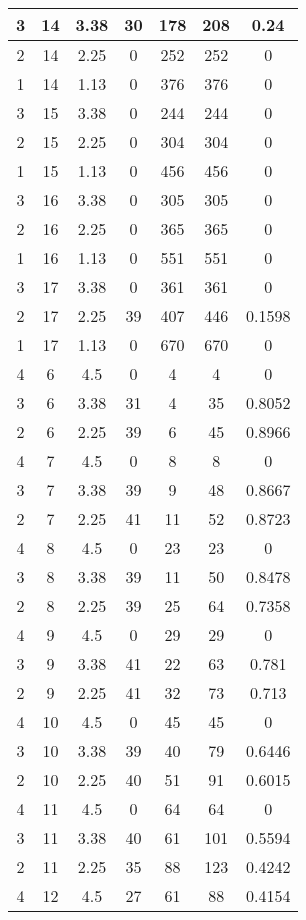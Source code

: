\documentclass[letterpaper, 12pt]{article}
\begin{document}
\begin{longtable}{|c|c|c|c|c|c|c|}
\hline
3 & 14 & 3.38 & 30 & 178 & 208 & 0.24 \\
\hline
2 & 14 & 2.25 & 0 & 252 & 252 & 0 \\
\hline
1 & 14 & 1.13 & 0 & 376 & 376 & 0 \\
\hline
3 & 15 & 3.38 & 0 & 244 & 244 & 0 \\
\hline
2 & 15 & 2.25 & 0 & 304 & 304 & 0 \\
\hline
1 & 15 & 1.13 & 0 & 456 & 456 & 0 \\
\hline
3 & 16 & 3.38 & 0 & 305 & 305 & 0 \\
\hline
2 & 16 & 2.25 & 0 & 365 & 365 & 0 \\
\hline
1 & 16 & 1.13 & 0 & 551 & 551 & 0 \\
\hline
3 & 17 & 3.38 & 0 & 361 & 361 & 0 \\
\hline
2 & 17 & 2.25 & 39 & 407 & 446 & 0.1598 \\
\hline
1 & 17 & 1.13 & 0 & 670 & 670 & 0 \\
\hline
4 & 6 & 4.5 & 0 & 4 & 4 & 0 \\
\hline
3 & 6 & 3.38 & 31 & 4 & 35 & 0.8052 \\
\hline
2 & 6 & 2.25 & 39 & 6 & 45 & 0.8966 \\
\hline
4 & 7 & 4.5 & 0 & 8 & 8 & 0 \\
\hline
3 & 7 & 3.38 & 39 & 9 & 48 & 0.8667 \\
\hline
2 & 7 & 2.25 & 41 & 11 & 52 & 0.8723 \\
\hline
4 & 8 & 4.5 & 0 & 23 & 23 & 0 \\
\hline
3 & 8 & 3.38 & 39 & 11 & 50 & 0.8478 \\
\hline
2 & 8 & 2.25 & 39 & 25 & 64 & 0.7358 \\
\hline
4 & 9 & 4.5 & 0 & 29 & 29 & 0 \\
\hline
3 & 9 & 3.38 & 41 & 22 & 63 & 0.781 \\
\hline
2 & 9 & 2.25 & 41 & 32 & 73 & 0.713 \\
\hline
4 & 10 & 4.5 & 0 & 45 & 45 & 0 \\
\hline
3 & 10 & 3.38 & 39 & 40 & 79 & 0.6446 \\
\hline
2 & 10 & 2.25 & 40 & 51 & 91 & 0.6015 \\
\hline
4 & 11 & 4.5 & 0 & 64 & 64 & 0 \\
\hline
3 & 11 & 3.38 & 40 & 61 & 101 & 0.5594 \\
\hline
2 & 11 & 2.25 & 35 & 88 & 123 & 0.4242 \\
\hline
4 & 12 & 4.5 & 27 & 61 & 88 & 0.4154 \\

\end{longtable}
\end{document}
